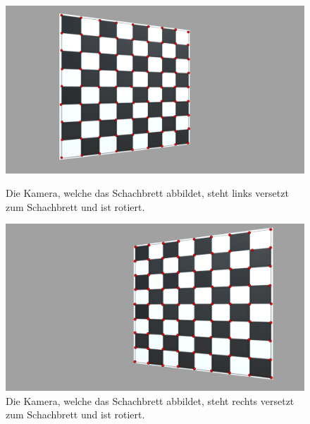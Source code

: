 \begin{figure}[!htb]
	\includegraphics[width=\linewidth]{images/ChessBoardLeft.png}
	\caption[Korrespondezsuche mit Sortierungsalgorithmus: Schachbrett auf linker Seite]{Die Kamera, welche das Schachbrett abbildet, steht links versetzt zum Schachbrett und ist rotiert.}
	\label{fig:ChessBoardLeft}
	\endminipage\hfill
	\includegraphics[width=\linewidth]{images/ChessBoardRight.png}
	\caption[Korrespondezsuche mit Sortierungsalgorithmus: Schachbrett auf rechter Seite]{Die Kamera, welche das Schachbrett abbildet, steht rechts versetzt zum Schachbrett und ist rotiert.}
	\label{fig:ChessBoardRight}
	\endminipage\hfill
\end{figure}


